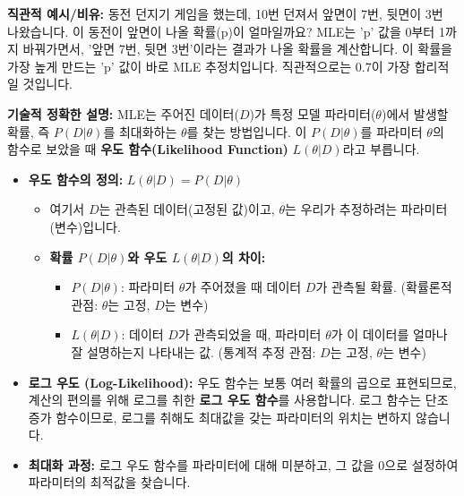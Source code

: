 \documentclass[11pt,a4paper]{article}
\begin{document}
\textbf{직관적 예시/비유:}
동전 던지기 게임을 했는데, 10번 던져서 앞면이 7번, 뒷면이 3번 나왔습니다. 이 동전이 앞면이 나올 확률(p)이 얼마일까요? MLE는 'p' 값을 0부터 1까지 바꿔가면서, '앞면 7번, 뒷면 3번'이라는 결과가 나올 확률을 계산합니다. 이 확률을 가장 높게 만드는 'p' 값이 바로 MLE 추정치입니다. 직관적으로는 0.7이 가장 합리적일 것입니다.

\textbf{기술적 정확한 설명:}
MLE는 주어진 데이터($D$)가 특정 모델 파라미터($\theta$)에서 발생할 확률, 즉 $P(D|\theta)$를 최대화하는 $\theta$를 찾는 방법입니다. 이 $P(D|\theta)$를 파라미터 $\theta$의 함수로 보았을 때 \textbf{우도 함수(Likelihood Function)} $L(\theta|D)$라고 부릅니다.

\begin{itemize}
    \item \textbf{우도 함수의 정의:} $L(\theta|D) = P(D|\theta)$
        \begin{itemize}
            \item 여기서 $D$는 관측된 데이터(고정된 값)이고, $\theta$는 우리가 추정하려는 파라미터(변수)입니다.
            \item \textbf{확률 $P(D|\theta)$와 우도 $L(\theta|D)$의 차이:}
                \begin{itemize}
                    \item $P(D|\theta)$: 파라미터 $\theta$가 주어졌을 때 데이터 $D$가 관측될 확률. (확률론적 관점: $\theta$는 고정, $D$는 변수)
                    \item $L(\theta|D)$: 데이터 $D$가 관측되었을 때, 파라미터 $\theta$가 이 데이터를 얼마나 잘 설명하는지 나타내는 값. (통계적 추정 관점: $D$는 고정, $\theta$는 변수)
                \end{itemize}
        \end{itemize}
    \item \textbf{로그 우도 (Log-Likelihood):} 우도 함수는 보통 여러 확률의 곱으로 표현되므로, 계산의 편의를 위해 로그를 취한 \textbf{로그 우도 함수}를 사용합니다. 로그 함수는 단조 증가 함수이므로, 로그를 취해도 최대값을 갖는 파라미터의 위치는 변하지 않습니다.
    \item \textbf{최대화 과정:} 로그 우도 함수를 파라미터에 대해 미분하고, 그 값을 0으로 설정하여 파라미터의 최적값을 찾습니다.
\end{itemize}
\end{document}

